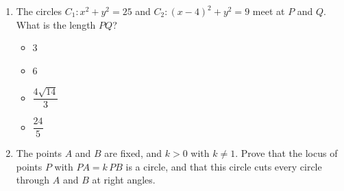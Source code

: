 \documentclass[11pt,a4paper]{article}
\begin{document}
\begin{enumerate}
\item The circles $C_1:x^2+y^2=25$ and $C_2:(x-4)^2+y^2=9$ meet at $P$ and $Q$. What is the length $PQ$?
\begin{itemize}
\item[A)] $3$
\item[B)] $6$
\item[C)] $\dfrac{4\sqrt{14}}{3}$
\item[D)] $\dfrac{24}{5}$
\end{itemize}

\item The points $A$ and $B$ are fixed, and $k>0$ with $k\ne1$. Prove that the locus of points $P$ with $PA=k\,PB$ is a circle, and that this circle cuts every circle through $A$ and $B$ at right angles.

\end{enumerate}

\end{document}

